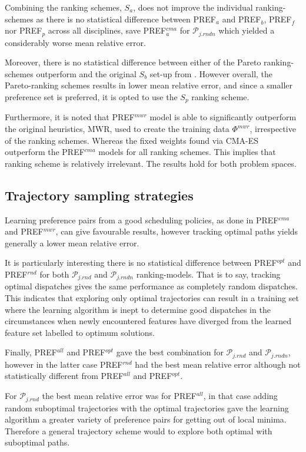 \documentclass[smallextended]{llncs}
\newcommand{\PREF}[2]{PREF$_{#2}^{#1}$}
\begin{document}
Combining the ranking schemes, $S_{a}$, does not improve the individual ranking-schemes as there is no statistical difference between \PREF{}{a} and \PREF{}{b}, \PREF{}{f} nor \PREF{}{p}  across all  disciplines, save \PREF{cma}{a} for $\mathcal{P}_{j.rndn}$ which yielded a considerably worse mean relative error. 

Moreover, there is no statistical difference between either of the Pareto ranking-schemes outperform and the original $S_b$ set-up from \cite{InRu11a}. However overall, the Pareto-ranking schemes results in lower mean relative error, and since a smaller preference set is preferred, it is opted to use the $S_{p}$ ranking scheme. 

Furthermore, it is noted that \PREF{mwr}{} model is able to significantly outperform the original heuristics, MWR, used to create the training data $\Phi^{mwr}$, irrespective of the ranking schemes. Whereas the fixed weights found via CMA-ES outperform the \PREF{cma}{} models for all ranking schemes. This implies that ranking scheme is relatively irrelevant. The results hold for both problem spaces. 

\subsection{Trajectory sampling strategies}\label{sec:expr:track}
Learning preference pairs from a good scheduling policies, as done  in \PREF{cma}{} and \PREF{mwr}{}, can give favourable results, however tracking optimal paths yields generally a lower mean relative error. 

It is particularly interesting there is no statistical difference between \PREF{opt}{} and \PREF{rnd}{} for both 
$\mathcal{P}_{j.rnd}$ and $\mathcal{P}_{j.rndn}$ ranking-models. That is to say, tracking optimal dispatches gives the same performance as completely random dispatches. This indicates that exploring 
only optimal trajectories can result in a training set where the learning algorithm is inept to determine good 
dispatches in the circumstances when newly encountered features have diverged from the learned feature set labelled to optimum solutions. 

Finally, \PREF{all}{} and \PREF{opt}{} gave the best combination for $\mathcal{P}_{j.rnd}$ and $\mathcal{P}_{j.rndn}$, however in the latter case \PREF{rnd}{} had the best mean relative error although not statistically different from \PREF{all}{} and \PREF{opt}{}.

For $\mathcal{P}_{j.rnd}$  the best mean relative error was for \PREF{all}{}, in that case adding random suboptimal trajectories with the optimal trajectories gave the learning algorithm a greater variety of preference pairs for getting out of local minima. Therefore a general trajectory scheme would to explore both optimal with suboptimal paths.
\end{document}
